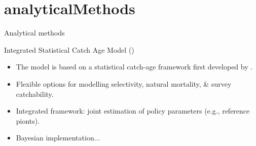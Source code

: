 \section{analyticalMethods} %
\label{sec:analyticalmethods}
%
\begin{frame} {Analytical methods} 
	
	\begin{block}
		{Integrated Statistical Catch Age Model (\iscam)}
		\begin{itemize}
			\item The model is based on a statistical catch-age framework first developed by \cite{fournier1982general}.
			
			\item Flexible options for modelling selectivity, natural mortality, \& survey catchability.
			
			\item Integrated framework: joint estimation of policy parameters (e.g., reference pionts).
			\item Bayesian implementation... 
		\end{itemize}
	\end{block}
\end{frame}
%
